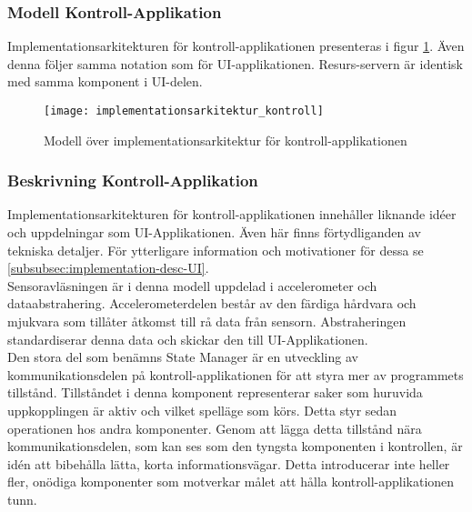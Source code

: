 \subsubsection{Modell Kontroll-Applikation}
Implementationsarkitekturen för kontroll-applikationen presenteras i figur \ref{fig:implementationsarkitektur-kontroll}. Även denna följer samma notation som för UI-applikationen. Resurs-servern är identisk med samma komponent i UI-delen.

\begin{figure}[h]
    \centering
    \texttt{[image: implementationsarkitektur\_kontroll]}
    \caption{Modell över implementationsarkitektur för kontroll-applikationen}
    \label{fig:implementationsarkitektur-kontroll}
\end{figure}

\subsubsection{Beskrivning Kontroll-Applikation}
Implementationsarkitekturen för kontroll-applikationen innehåller liknande idéer och uppdelningar som UI-Applikationen. Även här finns förtydliganden av tekniska detaljer. För ytterligare information och motivationer för dessa se \ref{subsubsec:implementation-desc-UI}.\\

Sensoravläsningen är i denna modell uppdelad i accelerometer och dataabstrahering. Accelerometerdelen består av den färdiga hårdvara och mjukvara som tillåter åtkomst till rå data från sensorn. Abstraheringen standardiserar denna data och skickar den till UI-Applikationen.\\

Den stora del som benämns State Manager är en utveckling av kommunikationsdelen på kontroll-applikationen för att styra mer av programmets tillstånd. Tillståndet i denna komponent representerar saker som huruvida uppkopplingen är aktiv och vilket spelläge som körs. Detta styr sedan operationen hos andra komponenter. Genom att lägga detta tillstånd nära kommunikationsdelen, som kan ses som den tyngsta komponenten i kontrollen, är idén att bibehålla lätta, korta informationsvägar. Detta introducerar inte heller fler, onödiga komponenter som motverkar målet att hålla kontroll-applikationen tunn.\\
